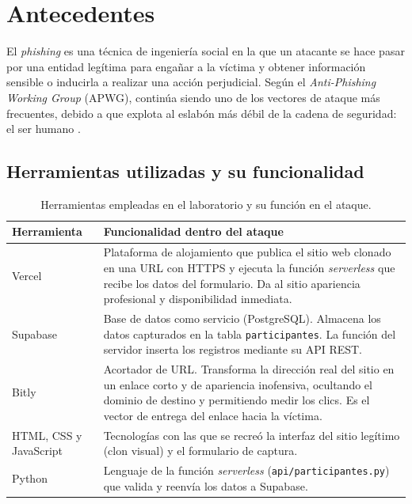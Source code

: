 \documentclass[12pt,a4paper]{article}
\begin{document}
\section{Antecedentes}

El \textit{phishing} es una técnica de ingeniería social en la que un atacante se hace pasar por una entidad legítima para engañar a la víctima y obtener información sensible o inducirla a realizar una acción perjudicial. Según el \textit{Anti-Phishing Working Group} (APWG), continúa siendo uno de los vectores de ataque más frecuentes, debido a que explota al eslabón más débil de la cadena de seguridad: el ser humano \citep{apwg2024, nistphishing}.

\subsection{Herramientas utilizadas y su funcionalidad}

\begin{table}[H]
\centering
\small
\caption{Herramientas empleadas en el laboratorio y su función en el ataque.}
\label{tab:herramientas}
\begin{tabular}{|p{3.2cm}|p{11.3cm}|}
\hline
\textbf{Herramienta} & \textbf{Funcionalidad dentro del ataque} \\ \hline
Vercel & Plataforma de alojamiento que publica el sitio web clonado en una URL con HTTPS y ejecuta la función \textit{serverless} que recibe los datos del formulario. Da al sitio apariencia profesional y disponibilidad inmediata. \\ \hline
Supabase & Base de datos como servicio (PostgreSQL). Almacena los datos capturados en la tabla \texttt{participantes}. La función del servidor inserta los registros mediante su API REST. \\ \hline
Bitly & Acortador de URL. Transforma la dirección real del sitio en un enlace corto y de apariencia inofensiva, ocultando el dominio de destino y permitiendo medir los clics. Es el vector de entrega del enlace hacia la víctima. \\ \hline
HTML, CSS y JavaScript & Tecnologías con las que se recreó la interfaz del sitio legítimo (clon visual) y el formulario de captura. \\ \hline
Python & Lenguaje de la función \textit{serverless} (\texttt{api/participantes.py}) que valida y reenvía los datos a Supabase. \\ \hline
\end{tabular}
\end{table}
\end{document}
